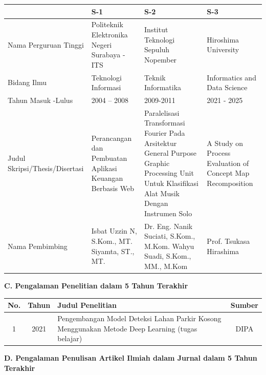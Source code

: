 {\footnotesize
\begin{longtable}{|p{3cm}|p{3.5cm}|p{4cm}|p{3.5cm}|}
\hline
& \textbf{S-1} & \textbf{S-2} & \textbf{S-3} \\
\hline
Nama Perguruan Tinggi & Politeknik Elektronika Negeri Surabaya - ITS & Institut Teknologi Sepuluh Nopember & Hiroshima University \\
\hline
Bidang Ilmu & Teknologi Informasi & Teknik Informatika & Informatics and Data Science \\
\hline
Tahun Masuk -Lulus & 2004 – 2008 & 2009-2011 & 2021 - 2025 \\
\hline
Judul Skripsi/Thesis/Disertasi & Perancangan dan Pembuatan Aplikasi Keuangan Berbasis Web & Paralelisasi Transformasi Fourier Pada Arsitektur General Purpose Graphic Processing Unit Untuk Klasifikasi Alat Musik Dengan Instrumen Solo & A Study on Process Evaluation of Concept Map Recomposition \\
\hline
Nama Pembimbing & Isbat Uzzin N, S.Kom., MT. Siyamta, ST., MT. & Dr. Eng. Nanik Suciati, S.Kom., M.Kom. Wahyu Suadi, S.Kom., MM., M.Kom & Prof. Tsukasa Hirashima \\
\hline
\end{longtable}
}

\textbf{C. Pengalaman Penelitian dalam 5 Tahun Terakhir}

{\footnotesize
\begin{longtable}{|c|c|p{10cm}|c|}
\hline
\textbf{No.} & \textbf{Tahun} & \textbf{Judul Penelitian} & \textbf{Sumber} \\
\hline
1 & 2021 & Pengembangan Model Deteksi Lahan Parkir Kosong Menggunakan Metode Deep Learning (tugas belajar) & DIPA \\
\hline
\end{longtable}
}

\textbf{D. Pengalaman Penulisan Artikel Ilmiah dalam Jurnal dalam 5 Tahun Terakhir}

